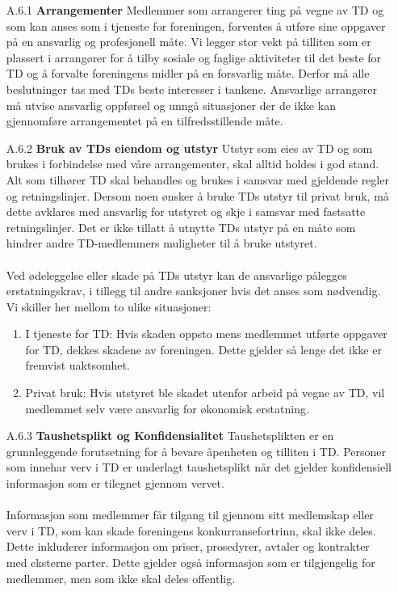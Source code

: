 \documentclass[11pt]{article}
\begin{document}
 \begin{itemize}
     \item[A.6.1] \textbf{Arrangementer}
     \newline
     Medlemmer som arrangerer ting på vegne av TD og som kan anses som i tjeneste for foreningen, forventes å utføre sine oppgaver på en ansvarlig og profesjonell måte. Vi legger stor vekt på tilliten som er plassert i arrangører for å tilby sosiale og faglige aktiviteter til det beste for TD og å forvalte foreningens midler på en forsvarlig måte. Derfor må alle beslutninger tas med TDs beste interesser i tankene. Ansvarlige arrangører må utvise ansvarlig oppførsel og unngå situasjoner der de ikke kan gjennomføre arrangementet på en tilfredsstillende måte.

     \item[A.6.2] \textbf{Bruk av TDs eiendom og utstyr} 
     \newline
     Utstyr som eies av TD og som brukes i forbindelse med våre arrangementer, skal alltid holdes i god stand. Alt som tilhører TD skal behandles og brukes i samsvar med gjeldende regler og retningslinjer. Dersom noen ønsker å bruke TDs utstyr til privat bruk, må dette avklares med ansvarlig for utstyret og skje i samsvar med fastsatte retningslinjer. Det er ikke tillatt å utnytte TDs utstyr på en måte som hindrer andre TD-medlemmers muligheter til å bruke utstyret.\\\\
     Ved ødeleggelse eller skade på TDs utstyr kan de ansvarlige pålegges erstatningskrav, i tillegg til andre sanksjoner hvis det anses som nødvendig. Vi skiller her mellom to ulike situasjoner:
     \begin{enumerate}
         \item I tjeneste for TD: Hvis skaden oppsto mens medlemmet utførte oppgaver for TD, dekkes skadene av foreningen. Dette gjelder så lenge det ikke er fremvist uaktsomhet.
         \item Privat bruk: Hvis utstyret ble skadet utenfor arbeid på vegne av TD, vil medlemmet selv være ansvarlig for økonomisk erstatning.
     \end{enumerate}

     \item[A.6.3] \textbf{Taushetsplikt og Konfidensialitet} 
     \newline
     Taushetsplikten er en grunnleggende forutsetning for å bevare åpenheten og tilliten i TD. Personer som innehar verv i TD er underlagt taushetsplikt når det gjelder konfidensiell informasjon som er tilegnet gjennom vervet.\\\\
     Informasjon som medlemmer får tilgang til gjennom sitt medlemskap eller verv i TD, som kan skade foreningens konkurransefortrinn, skal ikke deles. Dette inkluderer informasjon om priser, prosedyrer, avtaler og kontrakter med eksterne parter. Dette gjelder også informasjon som er tilgjengelig for medlemmer, men som ikke skal deles offentlig.


\end{itemize}
\end{document}
